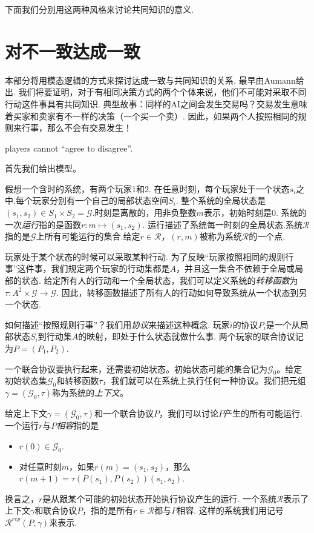 下面我们分别用这两种风格来讨论共同知识的意义.


\section{对不一致达成一致}

本部分将用模态逻辑的方式来探讨达成一致与共同知识的关系. 最早由Aumann给出. 我们将要证明，对于有相同决策方式的两个个体来说，他们不可能对采取不同行动这件事具有共同知识. 典型故事：同样的AI之间会发生交易吗？交易发生意味着买家和卖家有不一样的决策（一个买一个卖）. 因此，如果两个人按照相同的规则来行事，那么不会有交易发生！

\begin{center}
    players cannot ``agree to disagree''.
\end{center}

首先我们给出模型。

假想一个含时的系统，有两个玩家1和2. 在任意时刻，每个玩家处于一个状态$s_i$之中.每个玩家分别有一个自己的局部状态空间$S_i$. 整个系统的全局状态是$(s_1,s_2)\in S_1\times S_2=\mathcal G$.时刻是离散的，用非负整数$m$表示，初始时刻是$0$. 系统的一次\emph{运行}指的是函数$r:m\mapsto(s_1,s_2)$. 运行描述了系统每一时刻的全局状态.系统$\mathcal R$指的是$\mathcal G$上所有可能运行的集合.给定$r\in\mathcal R$，$(r,m)$被称为系统$\mathcal R$的一个点.

玩家处于某个状态的时候可以采取某种行动. 为了反映“玩家按照相同的规则行事”这件事，我们规定两个玩家的行动集都是$A$，并且这一集合不依赖于全局或局部的状态. 给定所有人的行动和一个全局状态，我们可以定义系统的\emph{转移函数}为$\tau:A^2\times\mathcal G\to\mathcal G$. 因此，转移函数描述了所有人的行动如何导致系统从一个状态到另一个状态.

如何描述“按照规则行事”？我们用\emph{协议}来描述这种概念. 玩家$i$的协议$P_i$是一个从局部状态$S_i$到行动集$A$的映射，即处于什么状态就做什么事. 两个玩家的联合协议记为$P=(P_1,P_2)$.

一个联合协议要执行起来，还需要初始状态。初始状态可能的集合记为$\mathcal G_0$。给定初始状态集$\mathcal G_0$和转移函数$\tau$，我们就可以在系统上执行任何一种协议。我们把元组$\gamma=(\mathcal G_0,\tau)$称为系统的\emph{上下文}。

给定上下文$\gamma=(\mathcal G_0,\tau)$和一个联合协议$P$，我们可以讨论$P$产生的所有可能运行. 一个运行$r$与$P$\emph{相容}指的是
    \begin{itemize}
        \item $r(0)\in\mathcal G_0$.
        \item 对任意时刻$m$，如果$r(m)=(s_1,s_2)$，那么$r(m+1)=\tau(P(s_1),P(s_2))(s_1,s_2)$.
    \end{itemize}
换言之，$r$是从跟某个可能的初始状态开始执行协议产生的运行. 一个系统$\mathcal R$表示了上下文$\gamma$和联合协议$P$，指的是所有$r\in\mathcal R$都与$P$相容. 这样的系统我们用记号$\mathcal R^{rep}(P,\gamma)$来表示.


